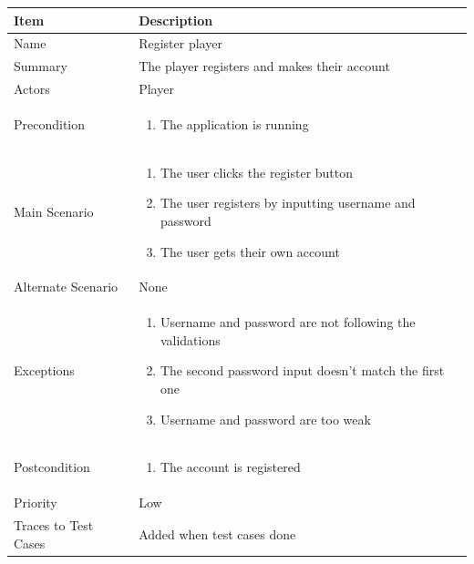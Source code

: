 \documentclass[12pt]{article}
\begin{document}
\begin{center}
\setlength{\tabcolsep}{18pt}
\renewcommand{\arraystretch}{1.3}
\begin{tabular}{ |p{3.4cm}|p{10cm}| }
    \hline
    
\textbf{Item} & \textbf{Description} \\
    \hline
    Name & Register player \\
    \hline
    Summary & The player registers and makes their account \\
    \hline
    Actors & Player \\
    \hline
    Precondition & 
    \vspace*{-0.1in}
    \begin{enumerate}[leftmargin=0.2in]
        \item The application is running
    \end{enumerate}  \\
    \hline
    Main Scenario &     
    \vspace*{-0.1in}
    \begin{enumerate}[leftmargin=0.2in]
        \item The user clicks the register button
        \item The user registers by inputting username and password
        \item The user gets their own account
    \end{enumerate} \\
    \hline
    Alternate Scenario & None \\
    \hline
    Exceptions & 
    \vspace*{-0.1in}
    \begin{enumerate}[leftmargin=0.2in]
        \item Username and password are not following the validations
        \item The second password input doesn't match the first one
        \item Username and password are too weak
    \end{enumerate}  \\
    \hline
    Postcondition &
    \vspace*{-0.1in}
    \begin{enumerate}[leftmargin=0.2in]
        \item The account is registered
    \end{enumerate}  \\
    \hline
    Priority & Low \\
    \hline
    \small{Traces to Test Cases} & Added when test cases done  \\
    \hline
\end{tabular}
\end{center}
\end{document}
